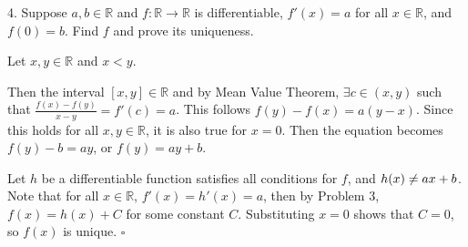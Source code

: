 \documentclass{article}
\begin{document}
4. Suppose $a, b \in \mathbb{R}$ and $f: \mathbb{R} \rightarrow \mathbb{R}$ is differentiable, $f'(x) = a $ for all $x \in \mathbb{R}$, and $f(0) = b$. Find $f$ and prove its uniqueness.

Let $x, y \in \mathbb{R}$ and $x < y$.

Then the interval $[x,y] \in \mathbb{R}$ and by Mean Value Theorem, $\exists c \in (x,y)$ such that $\frac{f(x)-f(y)}{x-y} = f'(c) = a$. This follows $f(y) - f(x) = a(y-x)$. Since this holds for all $x, y \in \mathbb{R}$, it is also true for $x=0$. Then the equation becomes $f(y) - b = ay$, or $f(y) = ay +b$. 

Let $h$ be a differentiable function satisfies all conditions for $f$, and $\newline h(x) \not= ax+b$. Note that for all $x \in \mathbb{R}$, $f'(x) = h'(x) = a$, then by Problem 3, $f(x) = h(x) + C$ for some constant $C$. Substituting $x=0$ shows that $C = 0$, so $f(x)$ is unique. $\square$
\end{document}
